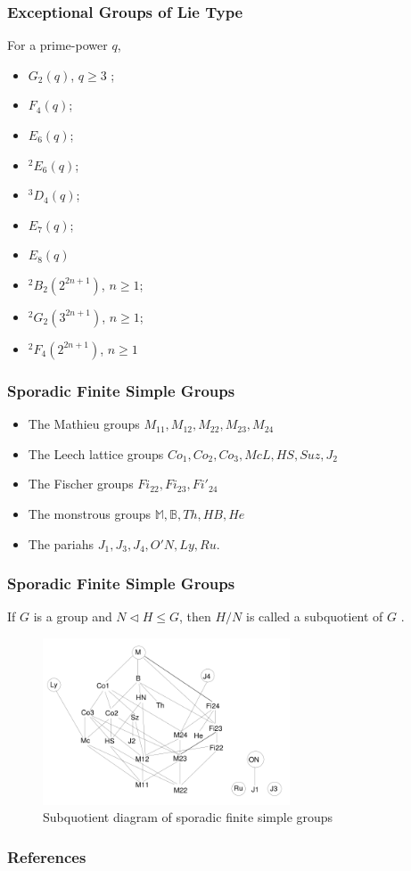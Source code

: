 \documentclass{beamer}
\begin{document}
\begin{frame}
	\frametitle{Exceptional Groups of Lie Type}
	For a prime-power $q$,
	\begin{multicols}{2}
	\begin{itemize}
		\item $G_2(q)$, $q \ge 3$ ;
		\item $F_4(q)$;
		\item $E_6(q)$;
		\item ${}^2E_6(q)$;
		\item ${}^3D_4(q)$;
		\item $E_7(q)$;
		\item $E_8(q)$
		\item ${}^2B_2(2^{2n+1})$, $n \ge 1$;
		\item ${}^2G_2(3^{2n+1})$, $n \ge 1$;
		\item ${}^2F_4(2^{2n+1})$, $n \ge 1$
	\end{itemize}
	\end{multicols}
\end{frame}

\begin{frame}
	\frametitle{Sporadic Finite Simple Groups}
	\begin{itemize}
		\item
		The Mathieu groups $M_{11}, M_{12}, M_{22}, M_{23}, M_{24}$
		\item
		The Leech lattice groups $Co_1, Co_2, Co_3, McL, HS, Suz, J_2$
		\item
		The Fischer groups $Fi_{22}, Fi_{23}, Fi'_{24}$
		\item
		The monstrous groups $\mathbb{M}, \mathbb{B}, Th, HB, He$
		\item
		The pariahs $J_1, J_3, J_4, O'N, Ly, Ru$.
	\end{itemize}
\end{frame}

\begin{frame}
	\frametitle{Sporadic Finite Simple Groups}
	\begin{definition}
		If $G$ is a group and $N \triangleleft H \le G$, then $H / N$ is called a subquotient of $G$ \cite{dummit}.
	\end{definition}
	\begin{figure}
		\centering
		\includegraphics[height=140pt,keepaspectratio]{monstergroupdiagram}
		\caption{Subquotient diagram of sporadic finite simple groups \cite{monsterdiagram}}
	\end{figure}
\end{frame}

\begin{frame}
	\frametitle{References}
	
	
\end{frame}
\end{document}
